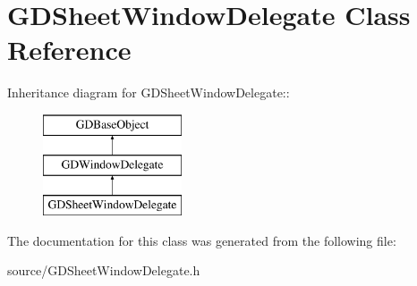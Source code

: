\hypertarget{interface_g_d_sheet_window_delegate}{
\section{GDSheetWindowDelegate Class Reference}
\label{interface_g_d_sheet_window_delegate}
}
Inheritance diagram for GDSheetWindowDelegate::\begin{figure}[H]
\begin{center}
\leavevmode
\includegraphics[height=3cm]{interface_g_d_sheet_window_delegate}
\end{center}
\end{figure}


The documentation for this class was generated from the following file:\begin{DoxyCompactItemize}
\item 
source/GDSheetWindowDelegate.h\end{DoxyCompactItemize}
